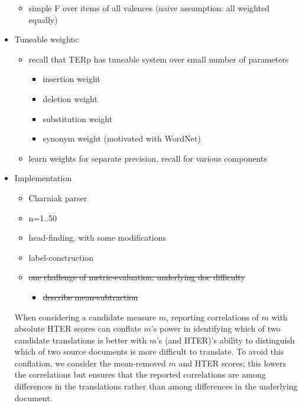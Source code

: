 \documentclass{kluwer}    %
\begin{document}
\begin{article}
\begin{itemize}
\begin{itemize}
  \item simple F over items of all valences (naive assumption: all
    weighted equally)
  \end{itemize}
\item Tuneable weights:
  \begin{itemize}
  \item recall that TERp has tuneable system over small number of parameters
    \begin{itemize}
    \item insertion weight
    \item deletion weight
    \item substitution weight
    \item synonym weight (motivated with WordNet)
    \end{itemize}
  \item learn weights for separate precision, recall for various
    components
  \end{itemize}
  
\item Implementation
  \begin{itemize}
  \item Charniak parser
  \item n=1..50
  \item head-finding, with some modifications
  \item label-construction
  \end{itemize}

\begin{itemize}
\item \sout{one challenge of metric-evaluation: underlying doc difficulty }
  \begin{itemize}
  \item \sout{describe mean-subtraction}
  \end{itemize}
\end{itemize}
When considering a candidate measure $m$, reporting correlations of
$m$ with absolute HTER scores can conflate $m$'s power in identifying
which of two candidate translations is better with $m$'s (and HTER)'s
ability to distinguish which of two source documents is more difficult
to translate. To avoid this conflation, we consider the mean-removed
$m$ and HTER scores; this lowers the correlations but ensures that the
reported correlations are among differences in the translations rather
than among differences in the underlying document.

\end{itemize}


\end{article}
\end{document}
